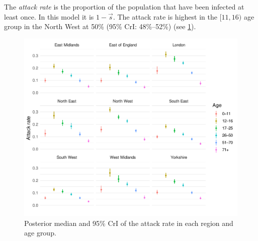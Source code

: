 \documentclass[thesis.tex]{subfiles}
\begin{document}
The \emph{attack rate} is the proportion of the population that have been infected at least once.
In this model it is $1 - \vec{s}$.
The attack rate is highest in the $[11, 16)$ age group in the North West at 50\% (95\% CrI: 48\%--52\%) (see \cref{SEIR:fig:attack-rates}).
\begin{figure}
    \includegraphics{SEIR/CIS/attack_rates}
    \caption{Posterior median and 95\% CrI of the attack rate in each region and age group.}
    \label{SEIR:fig:attack-rates}
\end{figure}
\end{document}
